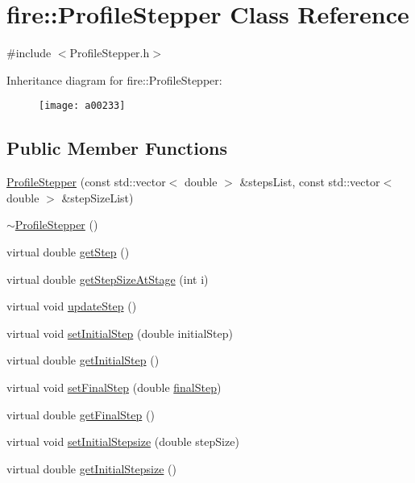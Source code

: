 \hypertarget{a00233}{}\section{fire\+:\+:Profile\+Stepper Class Reference}
\label{a00233}


{\ttfamily \#include $<$Profile\+Stepper.\+h$>$}

Inheritance diagram for fire\+:\+:Profile\+Stepper\+:\begin{figure}[H]
\begin{center}
\leavevmode
\texttt{[image: a00233]}
\end{center}
\end{figure}
\subsection*{Public Member Functions}
\begin{DoxyCompactItemize}
\item 
\hyperlink{a00233_a5bba5babbcb293b5e6a535cc4d06c55f}{Profile\+Stepper} (const std\+::vector$<$ double $>$ \&steps\+List, const std\+::vector$<$ double $>$ \&step\+Size\+List)
\item 
\hyperlink{a00233_a6838143d952dec2519a43c576a1f1546}{$\sim$\+Profile\+Stepper} ()
\item 
virtual double \hyperlink{a00233_a9096ad65a3fcf63678b600cbe0c33961}{get\+Step} ()
\item 
virtual double \hyperlink{a00233_adaa1a23c068977ecc6809dd8eecab49d}{get\+Step\+Size\+At\+Stage} (int i)
\item 
virtual void \hyperlink{a00233_a2c13fd4da5550f1e58df2b54bbfe4c2c}{update\+Step} ()
\item 
virtual void \hyperlink{a00233_adf2f78648d9539282225117c0fd243af}{set\+Initial\+Step} (double initial\+Step)
\item 
virtual double \hyperlink{a00233_af24660fa4bd027f877d5c1bdeb286cf5}{get\+Initial\+Step} ()
\item 
virtual void \hyperlink{a00233_af8203296b4f3bef53bafab7cb654cc97}{set\+Final\+Step} (double \hyperlink{a00233_a4f2347f039417fe9cdd16d3ca74a072d}{final\+Step})
\item 
virtual double \hyperlink{a00233_ae6f257aca7b3bb62a851169a01bcaacf}{get\+Final\+Step} ()
\item 
virtual void \hyperlink{a00233_a55c44fd97d8b6a474243ad0da48b039d}{set\+Initial\+Stepsize} (double step\+Size)
\item 
virtual double \hyperlink{a00233_a86e7035366907a08a36722655746271e}{get\+Initial\+Stepsize} ()
\end{DoxyCompactItemize}
